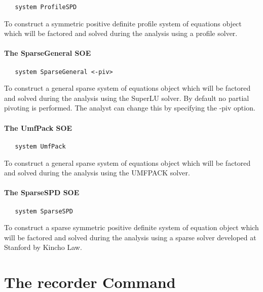 \documentclass[12pt]{article}
\begin{document}
{\sf\small
\begin{verbatim}
   system ProfileSPD
\end{verbatim}
}

\noindent To construct a symmetric positive definite profile system of equations
object which will be factored and solved during the analysis using a
profile solver.

\paragraph{The SparseGeneral SOE}

{\sf\small
\begin{verbatim}
   system SparseGeneral <-piv>
\end{verbatim}
}

\noindent To construct a general sparse system of equations
object which will be factored and solved during the analysis using the
SuperLU solver. By default no partial pivoting is performed. The
analyst can change this by specifying the -piv option.

\paragraph{The UmfPack SOE}

{\sf\small
\begin{verbatim}
   system UmfPack 
\end{verbatim}
}

\noindent To construct a general sparse system of equations
object which will be factored and solved during the analysis using the
UMFPACK solver. \\

\paragraph{The SparseSPD SOE}

{\sf\small
\begin{verbatim}
   system SparseSPD
\end{verbatim}
}

\noindent To construct a sparse symmetric positive definite system of
equation object which will be factored and solved during the analysis
using a sparse solver developed at Stanford by Kincho Law.

\section {The recorder Command}
\end{document}
